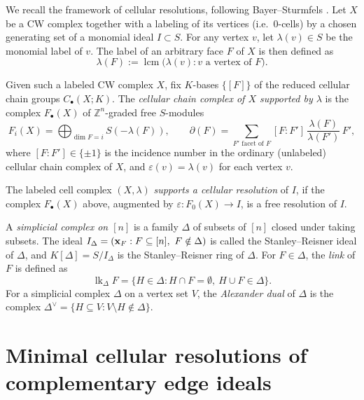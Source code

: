 \documentclass[12pt]{amsart}
\begin{document}
We recall the framework of cellular resolutions, following Bayer--Sturmfels \cite{bs1998}.
Let $X$ be a CW complex together with a labeling of its vertices (i.e.\ $0$-cells) by a chosen generating set of a monomial ideal $I\subset S$.  For any vertex $v$, let $\lambda(v)\in S$ be the monomial label of $v$. The label of an arbitrary face $F$ of $X$ is then defined as
	\[
	\lambda(F) := \operatorname{lcm}\big(\lambda(v) : v \text{ a vertex of } F\big).
	\]

Given such a labeled CW complex $X$, fix $K$-bases $\{[F]\}$ of the reduced cellular chain groups $C_{\bullet}(X;K)$. The \emph{cellular chain complex of $X$ supported by $\lambda$} is the complex $F_\bullet(X)$ of $\mathbb Z^n$-graded free $S$-modules
\[
F_i(X) = \bigoplus_{\dim F = i} S(-\lambda(F)),\qquad
\partial(F) = \sum_{F' \text{ facet of } F} [F:F']\,\frac{\lambda(F)}{\lambda(F')}\,F',
\]
where $[F:F']\in\{\pm1\}$ is the incidence number in the ordinary (unlabeled) cellular chain complex of $X$, and $\varepsilon(v)=\lambda(v)$ for each vertex $v$. 


The labeled cell complex $(X,\lambda)$ \emph{supports a cellular resolution} of $I$, if the complex $F_\bullet(X)$ above, augmented by $\varepsilon: F_0(X)\to I$, is a free resolution of $I$.  

A \emph{simplicial complex on $[n]$} is a family $\Delta$ of subsets of $[n]$ closed under taking subsets. The ideal $I_\Delta=({\bf x}_F : F\subseteq[n],\ F\notin\Delta)$ is called the Stanley--Reisner ideal of $\Delta$, and $K[\Delta]=S/I_\Delta$ is the Stanley--Reisner ring of $\Delta$.
For $F\in\Delta$, the {\em link} of $F$ is defined as
$$\operatorname{lk}_\Delta F=\{H\in\Delta : H\cap F=\emptyset,\ H\cup F\in\Delta\}.$$
For a simplicial complex $\Delta$ on a vertex set $V$, the  {\em Alexander dual} of $\Delta$ is the complex $\Delta^\vee=\{H\subseteq V : V\setminus H\notin\Delta\}$.

	
\section{Minimal cellular resolutions of complementary edge ideals}\label{sec2}
\end{document}
